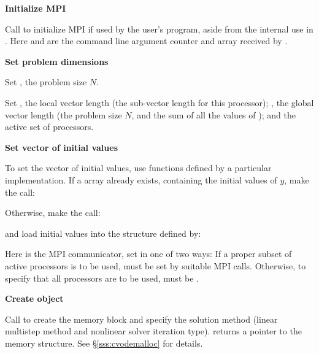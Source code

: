 \begin{Steps}
  
\item 
  {\bf {\p} Initialize MPI}

  Call  to initialize MPI if used by
  the user's program, aside from the internal use in {\nvecp}.  
  Here  and  are the command line argument 
  counter and array received by .
  
\item
  {\bf Set problem dimensions}

  {\s} Set , the problem size $N$.

  {\p} Set , the local vector length (the sub-vector
  length for this processor); , the global vector length (the
  problem size $N$, and the sum of all the values of );
  and the active set of processors.
  
\item
  {\bf Set vector of initial values}
 
  To set the vector  of initial values, use functions defined by a
  particular {\nvector} implementation.  If a  array  
  already exists, containing the initial values of $y$, make the call:

  {\s} 

  {\p} 

  Otherwise, make the call:

  {\s} 

  {\p} 

  and load initial values into the structure defined by:

  {\s} 

  {\p} 

  Here  is the MPI communicator, set in one of two ways: 
  If a proper subset of active processors is to be used,  
  must be set by suitable MPI calls. Otherwise, to specify that all 
  processors are to be used,  must be .
  
\item\label{i:cvode_create} 
  {\bf Create {\cvode} object}

  Call  
  to create the {\cvode} memory block and specify the solution method
  (linear multistep method and nonlinear solver iteration type).
   returns a pointer to the {\cvode} memory structure.
  See \S\ref{sss:cvodemalloc} for details.


\end{Steps}
